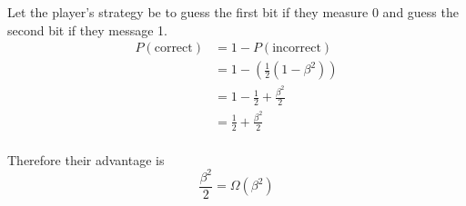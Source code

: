 Let the player's strategy be to guess the first bit if they measure 0 and guess the second bit if they message 1.
\begin{align*}
    P(\text{correct}) &= 1-P(\text{incorrect})\\
        &= 1-(\frac{1}{2}(1-\beta^2))\\
        &= 1-\frac{1}{2} + \frac{\beta^2}{2}\\
        &= \frac{1}{2} + \frac{\beta^2}{2}\\
\end{align*}

Therefore their advantage is 
\[\frac{\beta^2}{2} = \Omega(\beta^2)\]
